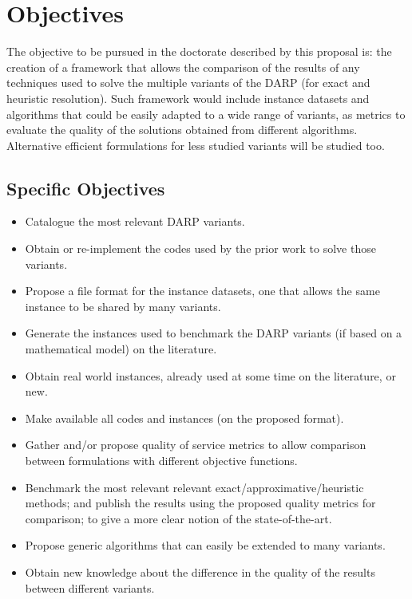 \documentclass[english,plano-doutorado,twoside]{iiufrgs}
\begin{document}
\section{Objectives}

The objective to be pursued in the doctorate described by this proposal is: the creation of a framework that allows the comparison of the results of any techniques used to solve the multiple variants of the DARP (for exact and heuristic resolution). Such framework would include instance datasets and algorithms that could be easily adapted to a wide range of variants, as metrics to evaluate the quality of the solutions obtained from different algorithms. Alternative efficient formulations for less studied variants will be studied too.

\subsection{Specific Objectives}
\begin{itemize}
    \item Catalogue the most relevant DARP variants.
    \item Obtain or re-implement the codes used by the prior work to solve those variants.
    \item Propose a file format for the instance datasets, one that allows the same instance to be shared by many variants.
    \item Generate the instances used to benchmark the DARP variants (if based on a mathematical model) on the literature.
    \item Obtain real world instances, already used at some time on the literature, or new.
    \item Make available all codes and instances (on the proposed format).
    \item Gather and/or propose quality of service metrics to allow comparison between formulations with different objective functions.
    \item Benchmark the most relevant relevant exact/approximative/heuristic methods; and publish the results using the proposed quality metrics for comparison; to give a more clear notion of the state-of-the-art.
    \item Propose generic algorithms that can easily be extended to many variants.
    \item Obtain new knowledge about the difference in the quality of the results between different variants.
\end{itemize}
\end{document}
